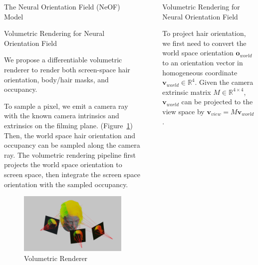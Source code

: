 \documentclass[final]{beamer}
\newlength{\sepwidth}
\newlength{\colwidth}
\newcommand{\separatorcolumn}{\begin{column}{\sepwidth}\end{column}}
\begin{document}
\begin{frame}[t]
\begin{columns}[t]
\begin{column}{\colwidth}
\begin{alertblock}{The Neural Orientation Field (NeOF) Model}
  \end{alertblock}

  \begin{alertblock}{Volumetric Rendering for Neural Orientation Field}
  
    We propose a differentiable volumetric renderer to render both screen-space hair orientation, body/hair masks, and occupancy.
    
    To sample a pixel, we emit a camera ray with the known camera intrinsics and extrinsics on the filming plane. (Figure~\ref{fig:volumetric-renderer}) Then, the world space hair orientation and occupancy can be sampled along the camera ray. The volumetric rendering pipeline first projects the world space orientation to screen space, then integrate the screen space orientation with the sampled occupancy.

    \begin{figure}
        \centering
        \includegraphics[width=0.6\linewidth]{project-final-paper/images/volumetric-renderer/volumetric-renderer.png}
        \caption{Volumetric Renderer}
        \label{fig:volumetric-renderer}
    \end{figure}
    
  \end{alertblock}

\end{column}

\separatorcolumn

\begin{column}{\colwidth}

  \begin{alertblock}{Volumetric Rendering for Neural Orientation Field}
    
    To project hair orientation, we first need to convert the world space orientation $\mathbf{o}_{world}$ to an orientation vector in homogeneous coordinate $\mathbf{v}_{world} \in \mathbb{R}^{4}$. Given the camera extrinsic matrix $M \in \mathbb{R}^{4 \times 4}$, $\mathbf{v}_{world}$ can be projected to the view space by $\mathbf{v}_{view} = M\mathbf{v}_{world}$.
    

\end{alertblock}
\end{column}
\end{columns}
\end{frame}
\end{document}
